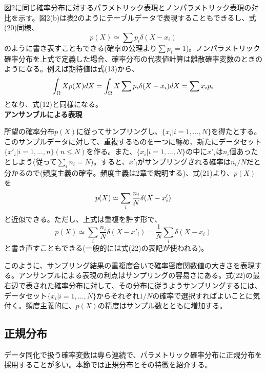 \documentclass[dvipdfmx, 9pt, a4paper]{jsarticle}
\begin{document}
図2に同じ確率分布に対するパラメトリック表現とノンパラメトリック表現の対比を示す。図2(b)は表2のようにテーブルデータで表現することもできるし、式(20)同様、
\begin{equation}
p(X) \simeq \sum p_i \delta(X-x_i)
\end{equation}
のように書き表すこともできる(確率の公理より$\sum p_i=1$)。ノンパラメトリック確率分布を上式で定義した場合、確率分布の代表値計算は離散確率変数のときのようになる。例えば期待値は式(13)から、
\begin{equation}
\int_\Omega Xp(X)dX=\int_\Omega X\sum p_i\delta(X-x_i)dX=\sum x_i p_i \notag
\end{equation}
となり、式(12)と同様になる。\bigskip \\
{\bf アンサンブルによる表現}\par
所望の確率分布$p(X)$に従ってサンプリングし、$\{ x_i|i=1,...,N \}$を得たとする。このサンプルデータに対して、重複するものを一つに纏め、新たにデータセット$\{ x'_i|i=1,...,n \}(n\leq N)$を作る。また、$\{ x_i|i=1,...,N \}$の中に$x'_i$は$n_i$個あったとしよう(従って$\sum_in_i=N$)。すると、$x'_i$がサンプリングされる確率は$n_i/N$だと分かるので(頻度主義の確率。頻度主義は2章で説明する)、式(21)より、$p(X)$を
\begin{equation}
p(X) \simeq \sum_i \frac{n_i}{N} \delta(X-x'_i) \notag
\end{equation}
と近似できる。ただし、上式は重複を許す形で、
\begin{equation}
p(X) \simeq \sum_i\frac{n_i}{N}\delta(X-x'_i) = \frac{1}{N} \sum_i \delta(X-x_i)
\end{equation}
と書き直すこともできる(一般的には式(22)の表記が使われる)。\par
このように、サンプリング結果の重複度合いで確率密度関数値の大きさを表現する。アンサンブルによる表現の利点はサンプリングの容易さにある。式(22)の最右辺で表された確率分布に対して、その分布に従うようサンプリングするには、データセット$\{ x_i|i=1,...,N \}$からそれぞれ$1/N$の確率で選択すればよいことに気付く。頻度主義的に、$p(X)$の精度はサンプル数とともに増加する。

\subsection{正規分布}
データ同化で扱う確率変数は専ら連続で、パラメトリック確率分布に正規分布を採用することが多い。本節では正規分布とその特徴を紹介する。
\end{document}
